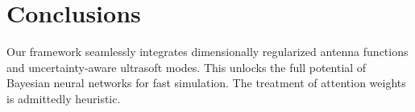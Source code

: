 \section{Conclusions}\label{sec:conclusions}

Our framework seamlessly integrates dimensionally regularized antenna
functions and uncertainty-aware ultrasoft modes. This unlocks the full
potential of Bayesian neural networks for fast simulation. The treatment
of attention weights is admittedly heuristic.

